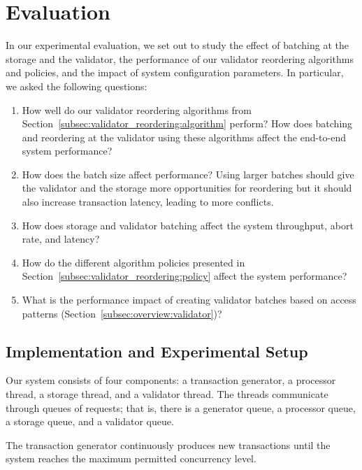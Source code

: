 \section{Evaluation}\label{sec:experiments}
In our experimental evaluation, we set out to study the effect of batching at the storage and the validator, the performance of our validator reordering algorithms and policies, and the impact of system configuration parameters. In particular, we asked the following questions:
\begin{enumerate}
\item\vspace{-.5em} How well do our validator reordering algorithms from Section~\ref{subsec:validator_reordering:algorithm} perform? How does batching and reordering at the validator using these algorithms affect the end-to-end system performance?
\item\vspace{-.5em} How does the batch size affect performance? Using larger batches should give the validator and the storage more opportunities for reordering but it should also increase transaction latency, leading to more conflicts. 
\item\vspace{-.5em} How does storage and validator batching affect the system throughput, abort rate, and latency?
\item\vspace{-.5em} How do the different algorithm policies presented in Section~\ref{subsec:validator_reordering:policy} affect the system performance?
\item\vspace{-.5em} What is the performance impact of creating validator batches based on access patterns (Section~\ref{subsec:overview:validator})?
\end{enumerate}

\subsection{Implementation and Experimental Setup}
\label{subsec:experiment:implementation}

Our system consists of four components: a transaction generator, a processor thread, a storage thread, and a validator thread. The threads communicate through queues of requests; that is, there is a generator queue, a processor queue, a storage queue, and a validator queue.

The transaction generator continuously produces new transactions until the system reaches the maximum permitted concurrency level. 

